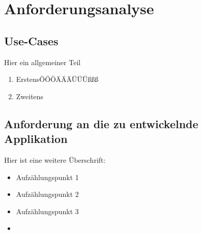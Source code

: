 \chapter{Anforderungsanalyse} 
\section{Use-Cases} \label{sec:Use-Cases}
Hier ein allgemeiner Teil

\begin{enumerate}
  \item ErstensÖÖÖÄÄÄÜÜÜßßß
  \item Zweitens
\end{enumerate}
\section{Anforderung an die zu entwickelnde Applikation}
Hier ist eine weitere Überschrift:
\begin{itemize}
  \item Aufzählungspunkt 1
  \item Aufzählungspunkt 2
  \item Aufzählungspunkt 3
  \item 
\end{itemize} 



